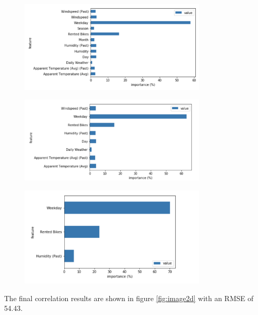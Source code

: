 \begin{figure}[H]
\centering
\includegraphics[width=0.8\textwidth]{media/test3_rd}\label{fig:test3_rd}
\label{fig:test3_rd}
\end{figure}
\begin{figure}[H]
\centering
\includegraphics[width=0.8\textwidth]{media/test4_rd}\label{fig:test4_rd}
\label{fig:test4_rd}
\end{figure}
\begin{figure}[H]
\centering
\includegraphics[width=0.8\textwidth]{media/test5_rd}\label{fig:test5_rd}
\label{fig:test5_rd}
\end{figure}
The final correlation results are shown in figure \ref{fig:image2d} with an RMSE of 54.43.
